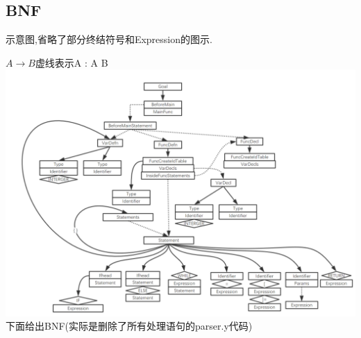 \documentclass[UTF8]{article}
\begin{document}
\subsection{BNF}
示意图,省略了部分终结符号和Expression的图示.

$A \to B$虚线表示A : A B\\
\includegraphics[width=\linewidth]{bnf} 
下面给出BNF(实际是删除了所有处理语句的parser.y代码)
\end{document}
